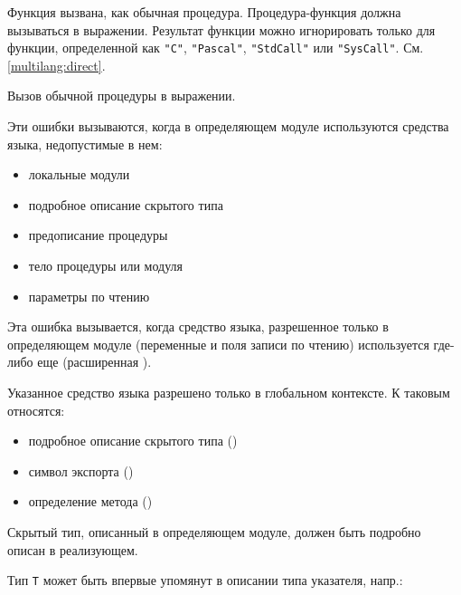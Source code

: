 
Функция вызвана, как обычная процедура. Процедура-функция должна вызываться
в выражении. Результат функции можно игнорировать только для функции,
определенной как 
\verb'"C"', \verb'"Pascal"', \verb'"StdCall"' или \verb'"SysCall"'.
См. \ref{multilang:direct}.


Вызов обычной процедуры в выражении.



Эти ошибки вызываются, когда в определяющем модуле используются 
средства языка, недопустимые в нем:
\begin{itemize}
\item локальные модули
\item подробное описание скрытого типа
\item предописание процедуры
\item тело процедуры или модуля
\item параметры по чтению
\end{itemize}


Эта ошибка вызывается, когда средство языка, разрешенное 
только в определяющем модуле (переменные и поля записи по чтению)
используется где-либо еще (расширенная \mt{}).


Указанное средство языка разрешено только в глобальном контексте.
К таковым относятся:

\begin{itemize}
\item подробное описание скрытого типа (\mt{})
\item символ экспорта (\ot{})
\item определение метода (\ot{})
\end{itemize}


Скрытый тип, описанный в определяющем модуле, должен быть
подробно описан в реализующем.


Тип \verb'T' может быть впервые упомянут в описании типа указателя,
напр.:

